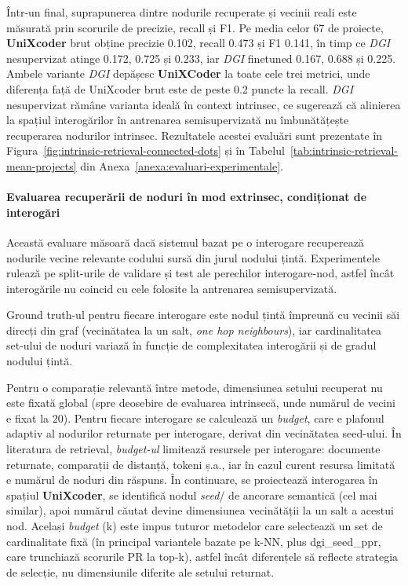 \documentclass[12pt]{article}
\numberwithin{equation}{section}
\numberwithin{figure}{section}
\numberwithin{table}{section}
\theoremstyle{definition}
\theoremstyle{plain}
\newcounter{anexa}
\begin{document}
Într-un final, suprapunerea dintre nodurile recuperate și vecinii reali este măsurată prin scorurile de precizie, recall și F1. Pe media celor 67 de proiecte, \textbf{UniXcoder} brut obține precizie 0.102, recall 0.473 și F1 0.141, în timp ce \textit{DGI} nesupervizat atinge 0.172, 0.725 și 0.233, iar \textit{DGI} finetuned 0.167, 0.688 și 0.225. Ambele variante \textit{DGI} depășesc \textbf{UniXCoder} la toate cele trei metrici, unde diferența față de UniXcoder brut este de peste 0.2 puncte la recall. \textit{DGI} nesupervizat rămâne varianta ideală în context intrinsec, ce sugerează că alinierea la spațiul interogărilor în antrenarea semisupervizată nu îmbunătățește recuperarea nodurilor intrinsec. Rezultatele acestei evaluări sunt prezentate în Figura~\ref{fig:intrinsic-retrieval-connected-dots} și în Tabelul~\ref{tab:intrinsic-retrieval-mean-projects} din Anexa~\ref{anexa:evaluari-experimentale}.

\paragraph{Evaluarea recuperării de noduri în mod extrinsec, condiționat de interogări}

Această evaluare măsoară dacă sistemul bazat pe o interogare recuperează nodurile vecine relevante codului sursă din jurul nodului țintă. Experimentele rulează pe split-urile de validare și test ale perechilor interogare-nod, astfel încât interogările nu coincid cu cele folosite la antrenarea semisupervizată.

Ground truth-ul pentru fiecare interogare este nodul țintă împreună cu vecinii săi direcți din graf (vecinătatea la un salt, \textit{one hop neighbours}), iar cardinalitatea set-ului de noduri variază în funcție de complexitatea interogării și de gradul nodului țintă.

Pentru o comparație relevantă între metode, dimensiunea setului recuperat nu este fixată global (spre deosebire de evaluarea intrinsecă, unde numărul de vecini e fixat la 20). Pentru fiecare interogare se calculează un \textit{budget}, care e plafonul adaptiv al nodurilor returnate per interogare, derivat din vecinătatea seed-ului. În literatura de retrieval, \textit{budget-ul} limitează resursele per interogare: documente returnate, comparații de distanță, tokeni ș.a., iar în cazul curent resursa limitată e numărul de noduri din răspuns. În continuare, se proiectează interogarea în spațiul \textbf{UniXcoder}, se identifică nodul \textit{seed}/ de ancorare semantică (cel mai similar), apoi numărul căutat devine dimensiunea vecinătății la un salt a acestui nod. Același \textit{budget} (k) este impus tuturor metodelor care selectează un set de cardinalitate fixă (în principal variantele bazate pe k-NN, plus dgi\_seed\_ppr, care trunchiază scorurile PR la top-k), astfel încât diferențele să reflecte strategia de selecție, nu dimensiunile diferite ale setului returnat.
\end{document}
